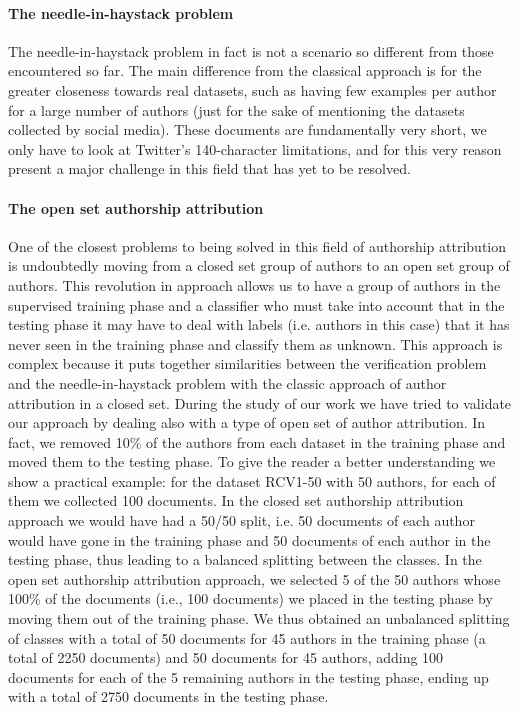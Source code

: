 \paragraph{The needle-in-haystack problem} The needle-in-haystack problem in fact is not a scenario so different from those encountered so far. The main difference from the classical approach is for the greater closeness towards real datasets, such as having few examples per author for a large number of authors (just for the sake of mentioning the datasets collected by social media). These documents are fundamentally very short, we only have to look at Twitter's 140-character limitations, and for this very reason present a major challenge in this field that has yet to be resolved.

\paragraph{The open set authorship attribution} One of the closest problems to being solved in this field of authorship attribution is undoubtedly moving from a closed set group of authors to an open set group of authors. This revolution in approach allows us to have a group of authors in the supervised training phase and a classifier who must take into account that in the testing phase it may have to deal with labels (i.e. authors in this case) that it has never seen in the training phase and classify them as unknown. This approach is complex because it puts together similarities between the verification problem and the needle-in-haystack problem with the classic approach of author attribution in a closed set.
During the study of our work we have tried to validate our approach by dealing also with a type of open set of author attribution.
In fact, we removed 10\% of the authors from each dataset in the training phase and moved them to the testing phase.
To give the reader a better understanding we show a practical example: for the dataset RCV1-50 with 50 authors, for each of them we collected 100 documents.
In the closed set authorship attribution approach we would have had a 50/50 split, i.e. 50 documents of each author would have gone in the training phase and 50 documents of each author in the testing phase, thus leading to a balanced splitting between the classes.
In the open set authorship attribution approach, we selected 5 of the 50 authors whose 100\% of the documents (i.e., 100 documents) we placed in the testing phase by moving them out of the training phase. We thus obtained an unbalanced splitting of classes with a total of 50 documents for 45 authors in the training phase (a total of 2250 documents) and 50 documents for 45 authors, adding 100 documents for each of the 5 remaining authors in the testing phase, ending up with a total of 2750 documents in the testing phase.
